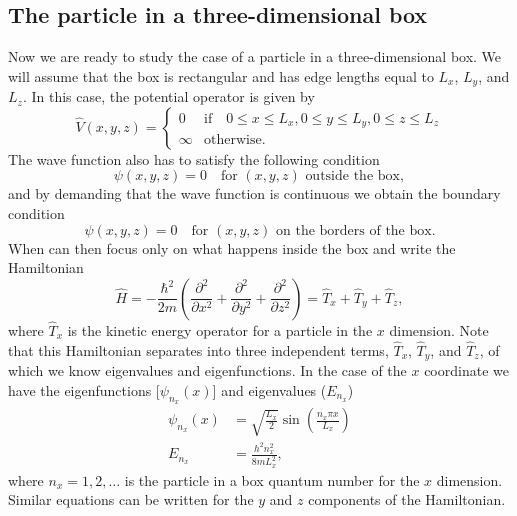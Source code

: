 \documentclass[../Main/chem331-notes.tex]{subfiles}
\begin{document}
\subsection{The particle in a three-dimensional box}
Now we are ready to study the case of a particle in a three-dimensional box.
We will assume that the box is rectangular and has edge lengths equal to $L_x$, $L_y$, and $L_z$.
In this case, the potential operator is given by
\begin{equation}
\hat{V}(x,y,z)  =
\begin{cases}
0 & \text{if}\quad 0 \leq x \leq L_x, 0 \leq y \leq L_y, 0 \leq z \leq L_z \\
\infty & \text{otherwise}.
\end{cases}
\end{equation}
The wave function also has to satisfy the following condition
\begin{equation}
\psi(x,y,z) = 0 \quad \text{for } (x,y,z) \text{ outside the box},
\end{equation}
and by demanding that the wave function is continuous we obtain the boundary condition
\begin{equation}
\psi(x,y,z) = 0 \quad \text{for } (x,y,z) \text{ on the borders of the box}.
\end{equation}
When can then focus only on what happens inside the box and write the Hamiltonian
\begin{equation}
\hat{H} = -\frac{\hbar^2}{2m}
\left(\frac{\partial^2}{\partial x^2} + \frac{\partial^2}{\partial y^2} + \frac{\partial^2}{\partial z^2} \right) = \hat{T}_x + \hat{T}_y + \hat{T}_z,
\end{equation}
where $\hat{T}_x$ is the kinetic energy operator for a particle in the $x$ dimension.
Note that this Hamiltonian separates into three independent terms,  $\hat{T}_x$, $\hat{T}_y$, and $\hat{T}_z$, of which we know eigenvalues and eigenfunctions.
In the case of the $x$ coordinate we have the eigenfunctions [$\psi_{n_x}(x)$] and eigenvalues ($E_{n_x}$)
\begin{equation}
\begin{split}
\psi_{n_x}(x) &= \sqrt{\frac{L_x}{2}} \sin \left(\frac{n_x \pi x}{L_x}\right) \\
E_{n_x} &= \frac{h^2 n_x^2}{8mL_x^2},
\end{split}
\end{equation}
where $n_x = 1, 2, \ldots$ is the particle in a box quantum number for the $x$ dimension.
Similar equations can be written for the $y$ and $z$ components of the Hamiltonian.
\end{document}
